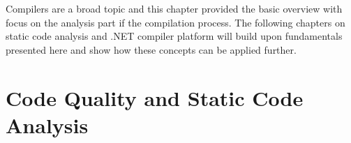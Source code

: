 \documentclass[
  digital, %
  table,   %
  lof,     %
  lot,     %
  oneside,
]{fithesis3}
\begin{document}
\bigskip
Compilers are a broad topic and this chapter provided the basic overview with focus on the analysis part if the compilation process. The following chapters on static code analysis and .NET compiler platform will build upon fundamentals presented here and show how these concepts can be applied further.

  \newpage
\chapter{Code Quality and Static Code Analysis}
\label{chap:static-code-analysis}
%
%
%
%
%  
\end{document}
